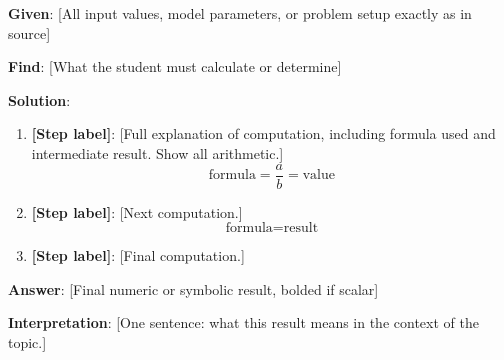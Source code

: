 %
%

\begin{tcolorbox}[colback=blue!5!white,colframe=blue!75!black,
    title=\textbf{Worked Example 1: [Title] (from source)}]

\textbf{Given}: [All input values, model parameters, or problem setup exactly as in source]

\textbf{Find}: [What the student must calculate or determine]

\textbf{Solution}:
\begin{enumerate}
    \item \textbf{[Step label]}: [Full explanation of computation, including formula used
          and intermediate result. Show all arithmetic.]
    \[
        \text{formula} = \frac{a}{b} = \text{value}
    \]
    \item \textbf{[Step label]}: [Next computation.]
    \[
        \text{formula} = \text{result}
    \]
    \item \textbf{[Step label]}: [Final computation.]
\end{enumerate}

\textbf{Answer}: [Final numeric or symbolic result, bolded if scalar]

\textbf{Interpretation}: [One sentence: what this result means in the context of the topic.]
\end{tcolorbox}

